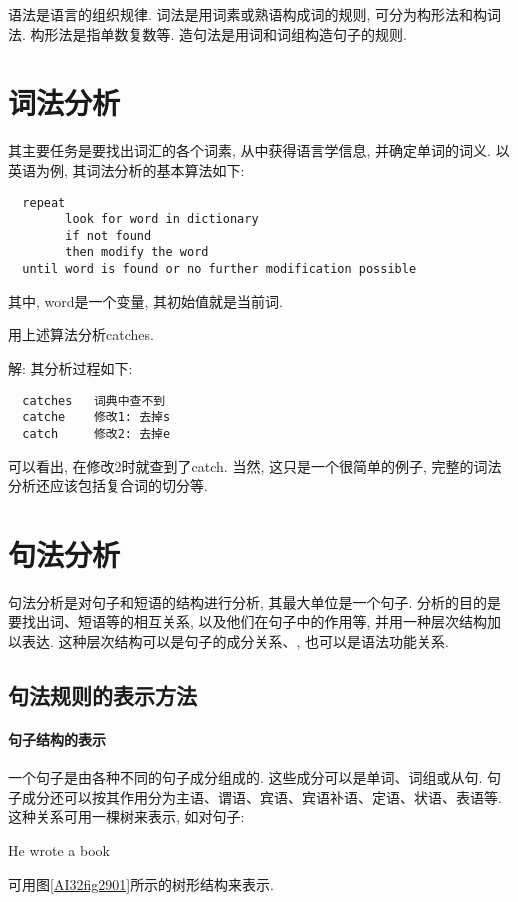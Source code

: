 语法是语言的组织规律. 词法是用词素或熟语构成词的规则, 可分为构形法和构词法. 构形法是指单数复数等. 造句法是用词和词组构造句子的规则.
\section{词法分析}
    其主要任务是要找出词汇的各个词素, 从中获得语言学信息, 并确定单词的词义. 以英语为例, 其词法分析的基本算法如下:
\begin{Verbatim}
  repeat
        look for word in dictionary
        if not found
        then modify the word
  until word is found or no further modification possible
\end{Verbatim}
其中, word是一个变量, 其初始值就是当前词.

\begin{example}
    用上述算法分析catches.
\end{example}

解: 其分析过程如下:
\begin{Verbatim}
  catches   词典中查不到
  catche    修改1: 去掉s
  catch     修改2: 去掉e
\end{Verbatim}

可以看出, 在修改2时就查到了catch. 当然, 这只是一个很简单的例子, 完整的词法分析还应该包括复合词的切分等.

\section{句法分析}
     句法分析是对句子和短语的结构进行分析, 其最大单位是一个句子. 分析的目的是要找出词、短语等的相互关系, 以及他们在句子中的作用等, 并用一种层次结构加以表达. 这种层次结构可以是句子的成分关系、, 也可以是语法功能关系.
\subsection{句法规则的表示方法}
\paragraph{句子结构的表示}
一个句子是由各种不同的句子成分组成的. 这些成分可以是单词、词组或从句. 句子成分还可以按其作用分为主语、谓语、宾语、宾语补语、定语、状语、表语等. 这种关系可用一棵树来表示, 如对句子:
\begin{center}
  He  wrote  a  book
\end{center}
可用图\ref{AI32fig2901}所示的树形结构来表示.

